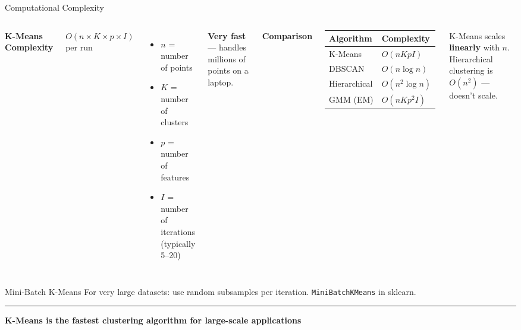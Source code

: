 \documentclass[8pt,aspectratio=169]{beamer}
\newcommand{\bottomnote}[1]{%
\vfill
\vspace{-2mm}
\textcolor{mllavender2}{\rule{\textwidth}{0.4pt}}
\vspace{1mm}
\footnotesize
\textbf{#1}
}
\newenvironment{compactlist}{%
  \begin{itemize}%
    \setlength{\itemsep}{2pt}%
    \setlength{\parskip}{0pt}%
    \setlength{\parsep}{0pt}%
}{%
  \end{itemize}%
}
\newcommand{\highlight}[1]{\textcolor{mlorange}{\textbf{#1}}}
\begin{document}
\begin{frame}[t]{Computational Complexity}
\begin{columns}[T]
\small
\textbf{K-Means Complexity}

\footnotesize
$O(n \times K \times p \times I)$ per run
\begin{compactlist}
\item \footnotesize $n$ = number of points
\item \footnotesize $K$ = number of clusters
\item \footnotesize $p$ = number of features
\item \footnotesize $I$ = number of iterations (typically 5--20)
\end{compactlist}

\vspace{2mm}
\highlight{Very fast} --- handles millions of points on a laptop.

\small
\textbf{Comparison}

\footnotesize
\begin{tabular}{ll}
\toprule
\textbf{Algorithm} & \textbf{Complexity} \\
\midrule
K-Means & $O(nKpI)$ \\
DBSCAN & $O(n \log n)$ \\
Hierarchical & $O(n^2 \log n)$ \\
GMM (EM) & $O(nKp^2 I)$ \\
\bottomrule
\end{tabular}

\vspace{2mm}
K-Means scales \textbf{linearly} with $n$. Hierarchical clustering is $O(n^2)$ --- doesn't scale.
\end{columns}

\vspace{3mm}
\begin{block}{Mini-Batch K-Means}
\footnotesize For very large datasets: use random subsamples per iteration. \texttt{MiniBatchKMeans} in sklearn.
\end{block}
\bottomnote{K-Means is the fastest clustering algorithm for large-scale applications}
\end{frame}

\end{document}
